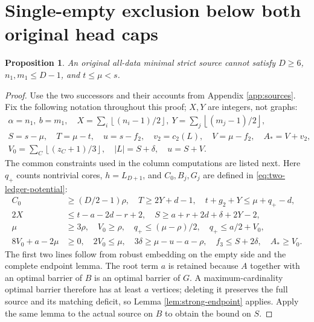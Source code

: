 \documentclass[11pt,a4paper]{article}
\newcommand{\floor}[1]{\left\lfloor#1\right\rfloor}
\newtheorem{proposition}[theorem]{Proposition}
\theoremstyle{definition}
\begin{document}
\section{Single-empty exclusion below both original head caps}\label{app:single-below}
\begin{proposition}\label{prop:single-below}
An original all-data minimal strict source cannot satisfy $D\ge6$, $n_1,m_1\le D-1$, and $t\le\mu<s$.
\end{proposition}
\begin{proof}
Use the two successors and their accounts from Appendix \ref{app:sources}. Fix the following notation throughout this proof; $X,Y$ are integers, not graphs:
\begin{gather*}
\alpha=n_1,\ b=m_1,\quad X=\sum_i\floor{(n_i-1)/2},\
Y=\sum_j\floor{(m_j-1)/2},\\
S=s-\mu,\quad T=\mu-t,\quad u=s-f_2,\quad
v_2=c_2(L),\quad V=\mu-f_2,\quad A_*=V+v_2,\\
V_0=\sum_C\floor{(z_C+1)/3},\quad |L|=S+\delta,\quad u=S+V.
\end{gather*}
The common constraints used in the column computations are listed next. Here $q_+$ counts nontrivial cores, $h=L_{D+1}$, and $C_0,B_j,G_j$ are defined in \eqref{eq:two-ledger-potential}:
\begin{align}
C_0&\ge(D/2-1)\rho,\quad T\ge2Y+d-1,\quad t+g_2+Y\le\mu+q_+-d,\label{eq:se-guards1}\\
2X&\le t-a-2d-r+2,\quad S\ge a+r+2d+\delta+2Y-2,\label{eq:se-guards2}\\
\mu&\ge3\rho,\quad V_0\ge\rho,\quad
q_+\le(\mu-\rho)/2,\quad q_+\le a/2+V_0,\label{eq:se-guards3}\\
8V_0+a-2\mu&\ge0,\quad2V_0\le\mu,\quad
3\delta\ge\mu-u-a-\rho,\quad f_3\le S+2\delta,\quad A_*\ge V_0.\label{eq:se-guards4}
\end{align}
The first two lines follow from robust embedding on the empty side and the complete endpoint lemma. The root term $a$ is retained because $A$ together with an optimal barrier of $B$ is an optimal barrier of $G$. A maximum-cardinality optimal barrier therefore has at least $a$ vertices; deleting it preserves the full source and its matching deficit, so Lemma \ref{lem:strong-endpoint} applies. Apply the same lemma to the actual source on $B$ to obtain the bound on $S$.


\end{proof}
\end{document}
